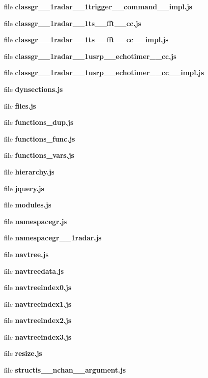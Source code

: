 \begin{DoxyCompactItemize}
\item 
file {\bf classgr\+\_\+\_\+1radar\+\_\+\_\+1trigger\+\_\+\+\_\+command\+\_\+\+\_\+impl.\+js}
\item 
file {\bf classgr\+\_\+\_\+1radar\+\_\+\_\+1ts\+\_\+\+\_\+fft\+\_\+\+\_\+cc.\+js}
\item 
file {\bf classgr\+\_\+\_\+1radar\+\_\+\_\+1ts\+\_\+\+\_\+fft\+\_\+\+\_\+cc\+\_\+\+\_\+impl.\+js}
\item 
file {\bf classgr\+\_\+\_\+1radar\+\_\+\_\+1usrp\+\_\+\+\_\+echotimer\+\_\+\+\_\+cc.\+js}
\item 
file {\bf classgr\+\_\+\_\+1radar\+\_\+\_\+1usrp\+\_\+\+\_\+echotimer\+\_\+\+\_\+cc\+\_\+\+\_\+impl.\+js}
\item 
file {\bf dynsections.\+js}
\item 
file {\bf files.\+js}
\item 
file {\bf functions\+\_\+dup.\+js}
\item 
file {\bf functions\+\_\+func.\+js}
\item 
file {\bf functions\+\_\+vars.\+js}
\item 
file {\bf hierarchy.\+js}
\item 
file {\bf jquery.\+js}
\item 
file {\bf modules.\+js}
\item 
file {\bf namespacegr.\+js}
\item 
file {\bf namespacegr\+\_\+\_\+1radar.\+js}
\item 
file {\bf navtree.\+js}
\item 
file {\bf navtreedata.\+js}
\item 
file {\bf navtreeindex0.\+js}
\item 
file {\bf navtreeindex1.\+js}
\item 
file {\bf navtreeindex2.\+js}
\item 
file {\bf navtreeindex3.\+js}
\item 
file {\bf resize.\+js}
\item 
file {\bf structis\+\_\+\+\_\+nchan\+\_\+\+\_\+argument.\+js}
\end{DoxyCompactItemize}

